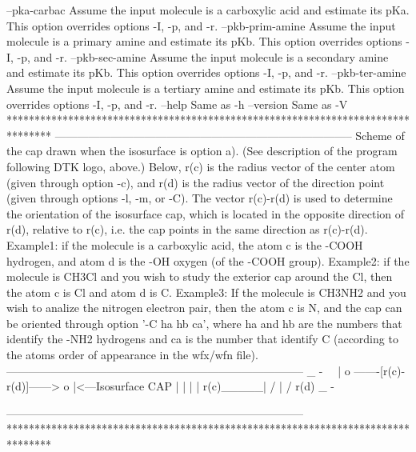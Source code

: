   --pka-carbac   	Assume the input molecule is a carboxylic acid and estimate
                 	  its pKa. This option overrides options -I, -p, and -r.
  --pkb-prim-amine	Assume the input molecule is a primary amine and estimate
                 	  its pKb. This option overrides options -I, -p, and -r.
  --pkb-sec-amine	Assume the input molecule is a secondary amine and estimate
                 	  its pKb. This option overrides options -I, -p, and -r.
  --pkb-ter-amine	Assume the input molecule is a tertiary amine and estimate
                 	  its pKb. This option overrides options -I, -p, and -r.
  --help    		Same as -h
  --version 		Same as -V
********************************************************************************
--------------------------------------------------------------------------------
Scheme of the cap drawn when the isosurface is option a).
(See description of the program following DTK logo, above.)
Below, r(c) is the radius vector
of the center atom (given through option -c), and r(d)
is the radius vector of the direction point (given through options
-l, -m, or -C).
The vector r(c)-r(d) is used to determine the orientation of the
isosurface cap, which is located in the opposite direction of r(d),
relative to r(c), i.e. the cap points in the same direction as
r(c)-r(d).
Example1: if the molecule is a carboxylic acid, the atom c is the -COOH
  hydrogen, and atom d is the -OH oxygen (of the -COOH group).
Example2: if the molecule is CH3Cl and you wish to study the exterior
  cap around the Cl, then the atom c is Cl and atom d is C.
Example3: If the molecule is CH3NH2 and you wish to analize the
  nitrogen electron pair, then the atom c is N, and the cap can
  be oriented through option '-C ha hb ca', where ha and hb are
  the numbers that identify the -NH2 hydrogens and ca is the number
  that identify C (according to the atoms order of appearance in
  the wfx/wfn file).
--------------------------------------------------------------------------------
                                     _
                                       -
                                         \
                                           \
                                            |
       o  -------[r(c)-r(d)]------> o        |<---Isosurface CAP
       |                            |       |
       |                   r(c)_____|      /
       |                                 /
     r(d)                            _ -

--------------------------------------------------------------------------------
********************************************************************************
